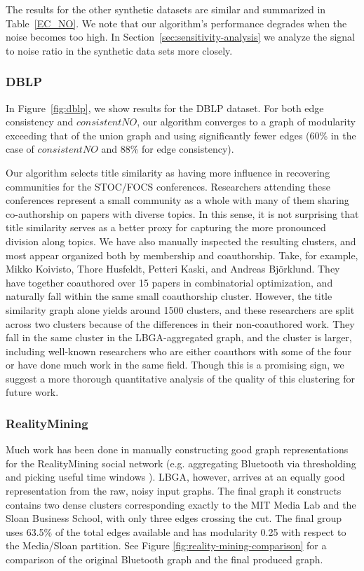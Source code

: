 \documentclass{article}
\begin{document}
The results for the other synthetic datasets are similar and summarized in
Table~\ref{EC_NO}. We note that our algorithm's performance degrades when the
noise becomes too high. In Section~\ref{sec:sensitivity-analysis} we analyze
the signal to noise ratio in the synthetic data sets more closely.

\subsubsection{DBLP}
In Figure~\ref{fig:dblp}, we show results for the DBLP dataset. For both edge
consistency and $consistentNO$, our algorithm converges to a graph of modularity
exceeding that of the union graph and using significantly fewer edges (60\% in
the case of $consistentNO$ and 88\% for edge consistency).

Our algorithm selects title similarity as having more influence in recovering
communities for the STOC/FOCS conferences. Researchers attending these
conferences represent a small community as a whole with many of them sharing
co-authorship on papers with diverse topics. In this sense, it is not
surprising that title similarity serves as a better proxy for capturing the
more pronounced division along topics. We have also manually inspected the
resulting clusters, and most appear organized both by membership and
coauthorship. Take, for example, Mikko Koivisto, Thore Husfeldt, Petteri Kaski,
and Andreas Bj\"{o}rklund. They have together coauthored over 15 papers in
combinatorial optimization, and naturally fall within the same small
coauthorship cluster. However, the title similarity graph alone yields around
1500 clusters, and these researchers are split across two clusters because of
the differences in their non-coauthored work. They fall in the same cluster in
the LBGA-aggregated graph, and the cluster is larger, including well-known
researchers who are either coauthors with some of the four or have done much
work in the same field. Though this is a promising sign, we suggest a more
thorough quantitative analysis of the quality of this clustering for future
work.

\subsubsection{RealityMining}
Much work has been done in manually constructing good graph representations for
the RealityMining social network (e.g. aggregating Bluetooth via thresholding
and picking useful time windows \cite{RealityMining,Caceres2011}).  LBGA,
however, arrives at an equally good representation from the raw, noisy input
graphs. The final graph it constructs contains two dense clusters corresponding
exactly to the MIT Media Lab and the Sloan Business School, with only three
edges crossing the cut. The final group uses 63.5\% of the total edges
available and has modularity 0.25 with respect to the Media/Sloan partition.
See Figure \ref{fig:reality-mining-comparison} for a comparison of the original
Bluetooth graph and the final produced graph.
\end{document}
